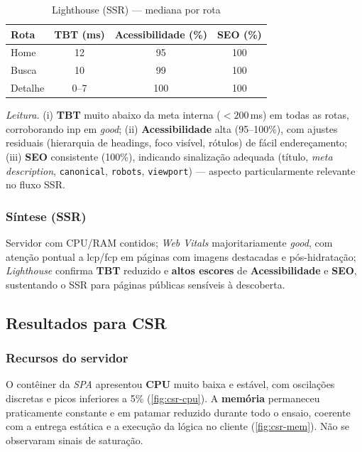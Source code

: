 \begin{table}[H]
\centering
\caption{Lighthouse (SSR) — mediana por rota}
\label{tab:lh-ssr}
\begin{tabular}{|l|c|c|c|}
\hline
\textbf{Rota} & \textbf{TBT (ms)} & \textbf{Acessibilidade (\%)} & \textbf{SEO (\%)} \\
\hline
Home    & 12 & 95  & 100 \\
Busca   & 10 & 99  & 100 \\
Detalhe & 0--7\footnotemark[1] & 100 & 100 \\
\hline
\end{tabular}
\end{table}

\noindent \textit{Leitura.}
(i) \textbf{TBT} muito abaixo da meta interna ($<200$\,ms) em todas as rotas, corroborando \acrshort{inp} em \textit{good};
(ii) \textbf{Acessibilidade} alta (95--100\%), com ajustes residuais (hierarquia de headings, foco visível, rótulos) de fácil endereçamento;
(iii) \textbf{SEO} consistente (100\%), indicando sinalização adequada (título, \emph{meta description}, \texttt{canonical}, \texttt{robots}, \texttt{viewport}) — aspecto particularmente relevante no fluxo SSR.

\subsubsection*{Síntese (SSR)}
Servidor com CPU/RAM contidos; \emph{Web Vitals} majoritariamente \textit{good}, com atenção pontual a \acrshort{lcp}/\acrshort{fcp} em páginas com imagens destacadas e pós-hidratação; \emph{Lighthouse} confirma \textbf{TBT} reduzido e \textbf{altos escores} de \textbf{Acessibilidade} e \textbf{SEO}, sustentando o SSR para páginas públicas sensíveis à descoberta.




\subsection{Resultados para CSR}
\label{subsec:resultados-csr}

\subsubsection*{Recursos do servidor}
O contêiner da \emph{SPA} apresentou \textbf{CPU} muito baixa e estável, com oscilações discretas e picos inferiores a 5\% (\autoref{fig:csr-cpu}). A \textbf{memória} permaneceu praticamente constante e em patamar reduzido durante todo o ensaio, coerente com a entrega estática e a execução da lógica no cliente (\autoref{fig:csr-mem}). Não se observaram sinais de saturação.

